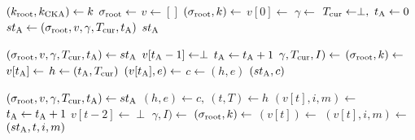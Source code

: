 \algrenewcommand\textproc{}
\algrenewcommand{}

\begin{minipage}{0.5\linewidth}
  {\fontsize{10}{12}\selectfont

  \begin{algorithmic}[1]
    \State $(k_\text{root},k_\text{CKA}) \gets k$
    \State $\sigma_\text{root} \gets$ 
    \State $v \gets []$
    \State $(\sigma_\text{root},k) \gets$ 
    \State $v[0] \gets$ 
    \State $\gamma \gets$ 
    \State $T_\text{cur} \gets \perp, \ t_\text{A} \gets 0$
    \State $st_\text{A} \gets (\sigma_\text{root},v,\gamma,T_\text{cur},t_\text{A})$
    \State \Return $st_\text{A}$
    \EndProcedure
    
    \item[]
    
    \State $(\sigma_\text{root},v,\gamma,T_\text{cur},t_\text{A}) \gets st_\text{A}$
    \State $v[t_\text{A}-1] \gets \perp$
    \State $t_\text{A} \gets t_\text{A}+1$
    \State $\gamma,T_\text{cur},I) \gets$ 
    \State $(\sigma_\text{root},k) \gets$ 
    \State $v[t_\text{A}] \gets$ 
    \EndIf
    \State $h \gets (t_\text{A},T_\text{cur})$
    \State $(v[t_\text{A}],e) \gets$ 
    \State $c \gets (h,e)$
    \State \Return $(st_\text{A},c)$
    \EndProcedure
  \end{algorithmic}
  }
\end{minipage}
\begin{minipage}{0.5\linewidth}
  {\fontsize{10}{12}\selectfont

  \begin{algorithmic}[1]
    \State $(\sigma_\text{root},v,\gamma,T_\text{cur},t_\text{A}) \gets st_\text{A}$
    \State $(h,e) \gets c, \ (t,T) \gets h$
    \State $(v[t],i,m) \gets$ 
    \State $t_\text{A} \gets t_\text{A}+1$
    \State $v[t-2] \gets \perp$
    \State $\gamma,I) \gets$ 
    \State $(\sigma_\text{root},k) \gets$ 
    \State $(v[t]) \gets$ 
    \State $(v[t],i,m) \gets$ 
    \EndIf
    \State \Return $(st_\text{A},t,i,m)$
    \EndProcedure
  \end{algorithmic}
  }
\end{minipage}

